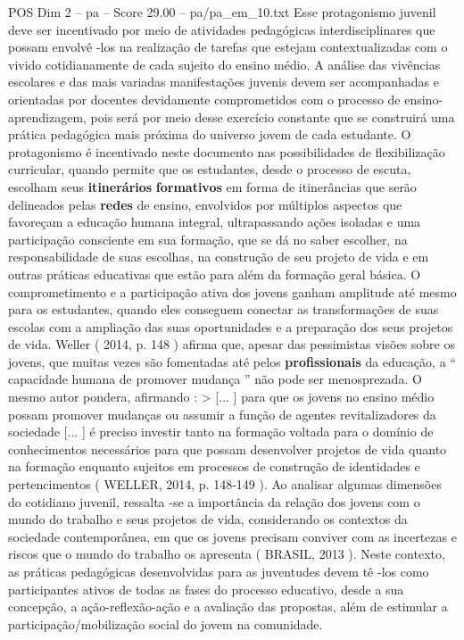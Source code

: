 \begin{textsample}{POS Dim 2 – pa – Score 29.00 – pa/pa\_em\_10.txt}
Esse protagonismo juvenil deve ser incentivado por meio de atividades pedagógicas interdisciplinares que possam envolvê -los na realização de tarefas que estejam contextualizadas com o vivido cotidianamente de cada sujeito do ensino médio.
A análise das vivências escolares e das mais variadas manifestações juvenis devem ser acompanhadas e orientadas por docentes devidamente comprometidos com o processo de ensino-aprendizagem, pois será por meio desse exercício constante que se construirá uma prática pedagógica mais próxima do universo jovem de cada estudante.
O protagonismo é incentivado neste documento nas possibilidades de flexibilização curricular, quando permite que os estudantes, desde o processo de escuta, escolham seus \textbf{itinerários} \textbf{formativos} em forma de itinerâncias que serão delineados pelas \textbf{redes} de ensino, envolvidos por múltiplos aspectos que favoreçam a educação humana integral, ultrapassando ações isoladas e uma participação consciente em sua formação, que se dá no saber escolher, na responsabilidade de suas escolhas, na construção de seu projeto de vida e em outras práticas educativas que estão para além da formação geral básica.
O comprometimento e a participação ativa dos jovens ganham amplitude até mesmo para os estudantes, quando eles conseguem conectar as transformações de suas escolas com a ampliação das suas oportunidades e a preparação dos seus projetos de vida.
Weller ( 2014, p. 148 ) afirma que, apesar das pessimistas visões sobre os jovens, que muitas vezes são fomentadas até pelos \textbf{profissionais} da educação, a “ capacidade humana de promover mudança ” não pode ser menosprezada.
O mesmo autor pondera, afirmando : > [... ] para que os jovens no ensino médio possam promover mudanças ou assumir a função de agentes revitalizadores da sociedade [... ] é preciso investir tanto na formação voltada para o domínio de conhecimentos necessários para que possam desenvolver projetos de vida quanto na formação enquanto sujeitos em processos de construção de identidades e pertencimentos ( WELLER, 2014, p. 148-149 ).
Ao analisar algumas dimensões do cotidiano juvenil, ressalta -se a importância da relação dos jovens com o mundo do trabalho e seus projetos de vida, considerando os contextos da sociedade contemporânea, em que os jovens precisam conviver com as incertezas e riscos que o mundo do trabalho os apresenta ( BRASIL, 2013 ).
Neste contexto, as práticas pedagógicas desenvolvidas para as juventudes devem tê -los como participantes ativos de todas as fases do processo educativo, desde a sua concepção, a ação-reflexão-ação e a avaliação das propostas, além de estimular a participação/mobilização social do jovem na comunidade.

\end{textsample}
